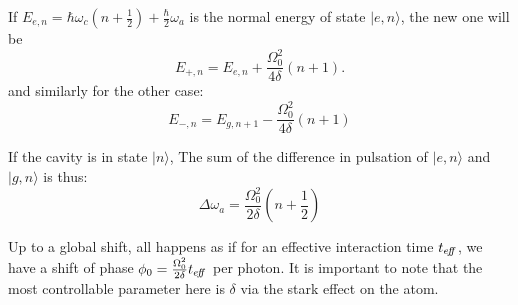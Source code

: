 \documentclass[10pt,a4paper]{report}
\theoremstyle{plain}
\theoremstyle{definition}
\theoremstyle{remark}
\newcommand{\ket}[1]{|#1\rangle}
\begin{document}
If $E_{e,n} = \hbar \omega_c(n + \frac12) + \frac\hbar2\omega_a$ is the normal
energy of state $\ket{e,n}$, the new one will be
\[E_{+,n} = E_{e,n} + \frac{\Omega_0^2}{4\delta}\left(n + 1\right).\]
and similarly for the other case:
\[E_{-,n} = E_{g,n+1} - \frac{\Omega_0^2}{4\delta}\left(n + 1\right)\]



If the cavity is in state $\ket n$, The sum of the difference in pulsation of
$\ket{e,n}$ and $\ket{g,n}$ is thus:
\[\Delta\omega_a = \frac{\Omega_0^2}{2\delta}\left(n + \frac 12\right)\]

Up to a global shift, all happens as if for an effective interaction time $t_{e\!f\!\!f}$,
we have a shift of phase $\phi_0 = \frac{\Omega_0^2}{2\delta}t_{e\!f\!\!f}$ per photon.
It is important to note that the most controllable parameter here is $\delta$ via the stark effect
on the atom.














\end{document}
